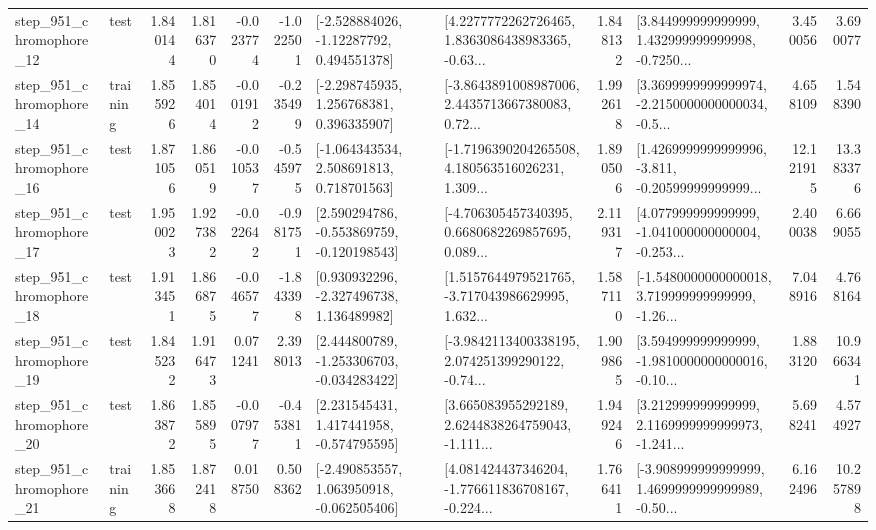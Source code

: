 \begin{tabular}{llrrrrllrlrr}
  step\_951\_chromophore\_12 &      test &      1.840144 &    1.816370 &     -0.023774 & -1.022501 &    [-2.528884026, -1.12287792, 0.494551378] &  [4.2277772262726465, 1.8363086438983365, -0.63... &       1.848132 &  [3.844999999999999, 1.432999999999998, -0.7250... &            3.450056 &          3.690077 \\
  step\_951\_chromophore\_14 &  training &      1.855926 &    1.854014 &     -0.001912 & -0.235499 &    [-2.298745935, 1.256768381, 0.396335907] &  [-3.8643891008987006, 2.4435713667380083, 0.72... &       1.992618 &  [3.3699999999999974, -2.2150000000000034, -0.5... &            4.658109 &          1.548390 \\
  step\_951\_chromophore\_16 &      test &      1.871056 &    1.860519 &     -0.010537 & -0.545975 &    [-1.064343534, 2.508691813, 0.718701563] &  [-1.7196390204265508, 4.180563516026231, 1.309... &       1.890506 &  [1.4269999999999996, -3.811, -0.20599999999999... &           12.121915 &         13.383376 \\
  step\_951\_chromophore\_17 &      test &      1.950023 &    1.927382 &     -0.022642 & -0.981751 &   [2.590294786, -0.553869759, -0.120198543] &  [-4.706305457340395, 0.6680682269857695, 0.089... &       2.119317 &  [4.077999999999999, -1.041000000000004, -0.253... &            2.400038 &          6.669055 \\
  step\_951\_chromophore\_18 &      test &      1.913451 &    1.866875 &     -0.046577 & -1.843398 &    [0.930932296, -2.327496738, 1.136489982] &  [1.5157644979521765, -3.717043986629995, 1.632... &       1.587110 &  [-1.5480000000000018, 3.719999999999999, -1.26... &            7.048916 &          4.768164 \\
  step\_951\_chromophore\_19 &      test &      1.845232 &    1.916473 &      0.071241 &  2.398013 &   [2.444800789, -1.253306703, -0.034283422] &  [-3.9842113400338195, 2.074251399290122, -0.74... &       1.909865 &  [3.594999999999999, -1.9810000000000016, -0.10... &            1.883120 &         10.966341 \\
  step\_951\_chromophore\_20 &      test &      1.863872 &    1.855895 &     -0.007977 & -0.453811 &    [2.231545431, 1.417441958, -0.574795595] &  [3.665083955292189, 2.6244838264759043, -1.111... &       1.949246 &  [3.212999999999999, 2.1169999999999973, -1.241... &            5.698241 &          4.574927 \\
  step\_951\_chromophore\_21 &  training &      1.853668 &    1.872418 &      0.018750 &  0.508362 &   [-2.490853557, 1.063950918, -0.062505406] &  [4.081424437346204, -1.776611836708167, -0.224... &       1.766411 &  [-3.908999999999999, 1.4699999999999989, -0.50... &            6.162496 &         10.257898 \\

\end{tabular}

